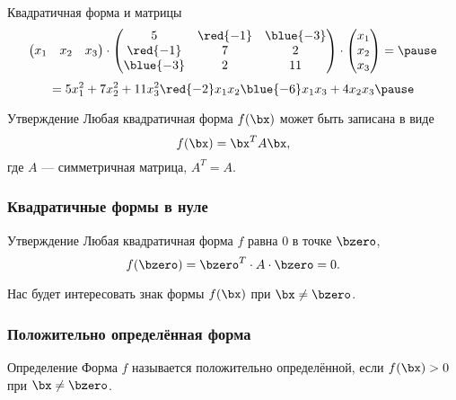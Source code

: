 \begin{frame}{Квадратичная форма и матрицы}
\[
\begin{pmatrix}
    x_1 & x_2 & x_3 
\end{pmatrix} \cdot \begin{pmatrix}
    5 & \red{-1} & \blue{-3} \\
    \red{-1} & 7 & 2 \\
    \blue{-3} & 2 & 11 \\
\end{pmatrix} \cdot 
\begin{pmatrix}
    x_1 \\
     x_2 \\ 
     x_3 \\
\end{pmatrix} = \pause
\]
\[
 = 5x_1^2 + 7x_2^2 + 11x_3^2 \red{- 2}x_1 x_2 \blue{- 6}x_1 x_3 + 4 x_2 x_3 \pause
\]
    
\begin{block}{Утверждение}
    Любая квадратичная форма $f(\bx)$ может быть записана в виде 
    \[
      f(\bx) = \bx^T A \bx,  
    \]
    где $A$ — симметричная матрица, $A^T = A$.
\end{block}


\end{frame}


\begin{frame}
    \frametitle{Квадратичные формы в нуле}

    \begin{block}{Утверждение}
        Любая квадратичная форма $f$ равна $0$ в точке $\bzero$,
        \[
        f(\bzero)  = \bzero^T \cdot A \cdot \bzero = 0.
        \]
    \end{block}
    \pause
    Нас будет интересовать знак формы $f(\bx)$ при $\bx \neq \bzero$.

\end{frame}


\begin{frame}
    \frametitle{Положительно определённая форма}

    \begin{block}{Определение}
        Форма $f$ называется \alert{положительно определённой}, если $f(\bx) > 0$ при $\bx\neq\bzero$.
    \end{block}

    \pause

    \begin{center}
    \end{center}
    
\end{frame}


